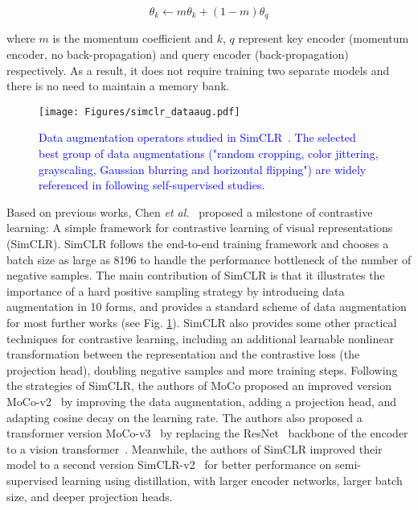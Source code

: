 \documentclass[lettersize,journal]{IEEEtran}
\newcommand{\etal}{\textit{et al.}}
\begin{document}
\begin{equation}
\theta_{k} \leftarrow m \theta_{k}+(1-m) \theta_{q}
\end{equation}

\noindent where $m$ is the momentum coefficient and $k$, $q$ represent key encoder (momentum encoder, no back-propagation) and query encoder (back-propagation) respectively. As a result, it does not require training two separate models and there is no need to maintain a memory bank.




\begin{figure}
\centering

\texttt{[image: Figures/simclr\_dataaug.pdf]}
\caption[dataaug]{
\textcolor{blue}{
Data augmentation operators studied in SimCLR~\cite{chen2020simple}. The selected best group of data augmentations ("random cropping, color jittering, grayscaling, Gaussian blurring and horizontal flipping") are widely referenced in following self-supervised studies.}
}
\label{fig:dataaug_simclr}
\end{figure}

Based on previous works, Chen \etal~\cite{chen2020simple} proposed a milestone of contrastive learning: A simple framework for contrastive learning of visual representations (SimCLR). SimCLR follows the end-to-end training framework and chooses a batch size as large as 8196 to handle the performance bottleneck of the number of negative samples. The main contribution of SimCLR is that it illustrates the importance of a hard positive sampling strategy by introducing data augmentation in 10 forms, and provides a standard scheme of data augmentation for most further works (see Fig. \ref{fig:dataaug_simclr}). SimCLR also provides some other practical techniques for contrastive learning, including an additional learnable nonlinear transformation between the representation and the contrastive loss (the projection head), doubling negative samples and more training steps. Following the strategies of SimCLR, the authors of MoCo proposed an improved version MoCo-v2~\cite{chen2020improved} by improving the data augmentation, adding a projection head, and adapting cosine decay on the learning rate. The authors also proposed a transformer version MoCo-v3~\cite{chen2021empirical} by replacing the ResNet~\cite{he2016deep} backbone of the encoder to a vision transformer~\cite{dosovitskiy2020image}. Meanwhile, the authors of SimCLR improved their model to a second version SimCLR-v2~\cite{chen2020big} for better performance on semi-supervised learning using distillation, with larger encoder networks, larger batch size, and deeper projection heads.
\end{document}
